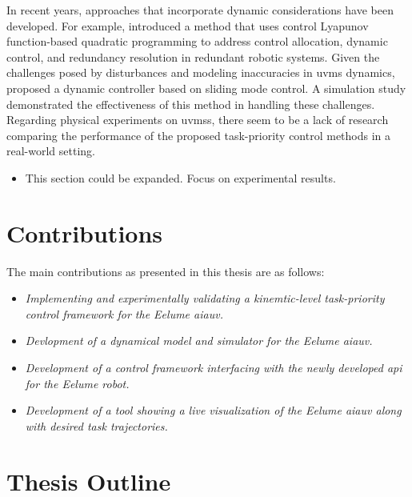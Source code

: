 In recent years, approaches that incorporate dynamic considerations have been 
developed. For example, \cite{basso2020} introduced a method that uses control 
Lyapunov function-based quadratic programming to address control allocation, 
dynamic control, and redundancy resolution in redundant robotic systems. Given 
the challenges posed by disturbances and modeling inaccuracies in \gls{uvms} 
dynamics, \cite{iversflaten2022} proposed a dynamic controller based on sliding 
mode control. A simulation study demonstrated the effectiveness of this method 
in handling these challenges. Regarding physical experiments on \gls{uvms}s, there 
seem to be a lack of research comparing the performance of the proposed 
task-priority control methods in a real-world setting.

{
\color{red}
\begin{itemize}
    \item This section could be expanded. Focus on experimental results.
\end{itemize}
}

\section{Contributions}

The main contributions as presented in this thesis are as follows:
\begin{itemize}
    \item \emph{Implementing and experimentally validating a kinemtic-level task-priority control framework for the Eelume \gls{aiauv}.}
    \item \emph{Devlopment of a dynamical model and simulator for the Eelume \gls{aiauv}.}
    \item \emph{Development of a control framework interfacing with the newly developed \gls{api} for the Eelume robot.}
    \item \emph{Development of a tool showing a live visualization of the Eelume \gls{aiauv} along with desired task trajectories.}
\end{itemize}

\section{Thesis Outline}

